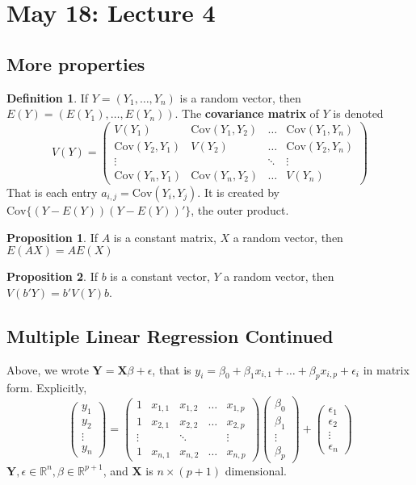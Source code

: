 \documentclass[12pt, a4paper]{article}
\theoremstyle{definition}
\newtheorem{proposition}{Proposition}
\newtheorem{definition}{Definition}
\newcommand{\R}{\mathbb{R}}                           %
\newcommand{\eps}{\epsilon}
\newcommand{\Cov}{\mathrm{Cov}}
\newcommand{\pmat}[1]{\begin{pmatrix}#1\end{pmatrix}}
\begin{document}
		\section{May 18: Lecture 4}
		
		\subsection{More properties}
		\begin{definition}
			If $Y = (Y_1, \ldots, Y_n)$ is a random vector, then 
			$
				E(Y) = (E(Y_1), \ldots, E(Y_n))
			$. The {\bf covariance matrix} of $Y$ is denoted
			$$
				V(Y) = 
				\pmat{ 
				V(Y_1) & \Cov(Y_1, Y_2) & \ldots & \Cov(Y_1, Y_n) \\
				\Cov(Y_2, Y_1) & V(Y_2) & \ldots & \Cov(Y_2, Y_n) \\
				\vdots && \ddots & \vdots \\
				\Cov(Y_n, Y_1) & \Cov(Y_n, Y_2) & \ldots & V(Y_n)
				 }
			$$ That is each entry $a_{i,j} = \Cov(Y_i, Y_j)$. It is created by $\Cov \{(Y - E(Y))(Y-E(Y))'\}$, the outer product. 
		\end{definition}
		
		\begin{proposition}
			If $A$ is a constant matrix, $X$ a random vector, then $E(AX) = A E(X)$
		\end{proposition}
		\begin{proposition}
			If $b$ is a constant vector, $Y$ a random vector, then $V(b'Y) = b'V(Y)b$.
		\end{proposition}
		
		\subsection{Multiple Linear Regression Continued}
		Above, we wrote $\mathbf{Y} = \mathbf{X} \beta + \eps$, that is  $y_i = \beta_0 + \beta_1 x_{i, 1} + \ldots + \beta_p x_{i, p} + \eps_i$ in matrix form. Explicitly,
		$$
		\pmat{
			y_1 \\ y_2 \\ \vdots \\ y_n	
			} =
		\pmat{1 & x_{1,1} & x_{1,2} & \ldots & x_{1,p} \\
			1 & x_{2,1} & x_{2,2} & \ldots & x_{2,p} \\
			\vdots && \ddots && \vdots \\
			1 & x_{n,1} & x_{n,2} & \ldots & x_{n,p} 
		} \pmat{ \beta_0 \\ \beta_1 \\ \vdots \\ \beta_p} + \pmat{\eps_1 \\ \eps_2 \\ \vdots \\ \eps_n}
		$$
		$\mathbf Y, \eps \in \R^n, \beta \in \R^{p+1}$, and $\mathbf X$ is $n \times (p+1)$ dimensional.\\
	
\end{document}
